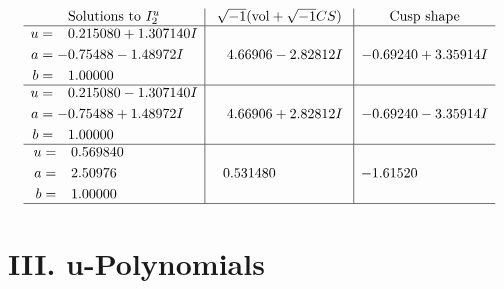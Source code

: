 \documentclass[1p]{elsarticle_modified}
\theoremstyle{definition}
\newcommand{\I}{\sqrt{-1}}
\begin{document}
$$\begin{array}{c|c|c}  
\text{Solutions to }I^u_{2}& \I (\text{vol} + \sqrt{-1}CS) & \text{Cusp shape}\\
 \hline 
\begin{aligned}
u &= \phantom{-}0.215080 + 1.307140 I \\
a &= -0.75488 - 1.48972 I \\
b &= \phantom{-}1.00000\phantom{ +0.000000I}\end{aligned}
 & \phantom{-}4.66906 - 2.82812 I & -0.69240 + 3.35914 I \\ \hline\begin{aligned}
u &= \phantom{-}0.215080 - 1.307140 I \\
a &= -0.75488 + 1.48972 I \\
b &= \phantom{-}1.00000\phantom{ +0.000000I}\end{aligned}
 & \phantom{-}4.66906 + 2.82812 I & -0.69240 - 3.35914 I \\ \hline\begin{aligned}
u &= \phantom{-}0.569840\phantom{ +0.000000I} \\
a &= \phantom{-}2.50976\phantom{ +0.000000I} \\
b &= \phantom{-}1.00000\phantom{ +0.000000I}\end{aligned}
 & \phantom{-}0.531480\phantom{ +0.000000I} & -1.61520\phantom{ +0.000000I}\\
 \hline 
 \end{array}$$\newpage
\newpage\renewcommand{\arraystretch}{1}
\centering \section*{ III. u-Polynomials}
\end{document}
